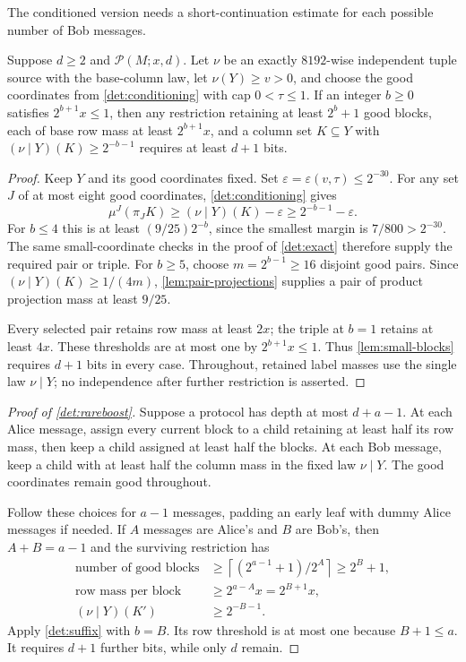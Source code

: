 \documentclass[11pt]{article} \usepackage[utf8]{inputenc}
\theoremstyle{plain} \newtheorem{theorem}{Theorem}[section]
\theoremstyle{definition} \newaliascnt{definition}{theorem}
\newcommand{\RP}[3]{\mathcal{P}(#1;#2,#3)}
\newcommand{\ceil}[1]{\left\lceil#1\right\rceil}
\begin{document}
The conditioned version needs a short-continuation estimate for each possible
number of Bob messages.

\begin{lemma}\label{det:suffix}
Suppose $d\ge2$ and $\RP{M}{x}{d}$. Let $\nu$ be an exactly $8192$-wise
independent tuple source with the base-column law, let $\nu(Y)\ge v>0$, and
choose the good coordinates from \cref{det:conditioning} with cap
$0<\tau\le1$. If an integer $b\ge0$ satisfies $2^{b+1}x\le1$, then any
restriction retaining at least $2^b+1$ good blocks, each of base row mass at
least $2^{b+1}x$, and a column set $K\subseteq Y$ with
$(\nu\mid Y)(K)\ge2^{-b-1}$ requires at least $d+1$ bits.
\end{lemma}
\begin{proof}
Keep $Y$ and its good coordinates fixed. Set
$\varepsilon=\varepsilon(v,\tau)\le2^{-30}$. For any set $J$ of at most
eight good coordinates, \cref{det:conditioning} gives
\[
\mu^J(\pi_JK)\ge(\nu\mid Y)(K)-\varepsilon
\ge2^{-b-1}-\varepsilon.
\]
For $b\le4$ this is at least $(9/25)2^{-b}$, since the smallest margin is
$7/800>2^{-30}$. The same small-coordinate checks in the proof of
\cref{det:exact} therefore supply the required pair or triple.
For $b\ge5$, choose $m=2^{b-1}\ge16$ disjoint good pairs. Since
$(\nu\mid Y)(K)\ge1/(4m)$, \cref{lem:pair-projections} supplies a pair of
product projection mass at least $9/25$.

Every selected pair retains row mass at least $2x$; the triple at $b=1$
retains at least $4x$. These thresholds are at most one by
$2^{b+1}x\le1$. Thus \cref{lem:small-blocks} requires $d+1$ bits in every
case. Throughout, retained label masses use the single law $\nu\mid Y$;
no independence after further restriction is asserted.
\end{proof}

\begin{proof}[Proof of \cref{det:rareboost}]
Suppose a protocol has depth at most $d+a-1$. At each Alice message, assign
every current block to a child retaining at least half its row mass, then
keep a child assigned at least half the blocks. At each Bob message, keep
a child with at least half the column mass in the fixed law $\nu\mid Y$.
The good coordinates remain good throughout.

Follow these choices for $a-1$ messages, padding an early leaf with dummy
Alice messages if needed. If $A$ messages are Alice's and $B$ are Bob's,
then $A+B=a-1$ and the surviving restriction has
\[
\begin{aligned}
\text{number of good blocks}
&\ge\ceil{(2^{a-1}+1)/2^A}\ge2^B+1,\\
\text{row mass per block}&\ge2^{a-A}x=2^{B+1}x,\\
(\nu\mid Y)(K')&\ge2^{-B-1}.
\end{aligned}
\]
Apply \cref{det:suffix} with $b=B$. Its row threshold is at most one because
$B+1\le a$. It requires $d+1$ further bits, while only $d$ remain.
\end{proof}
\end{document}
